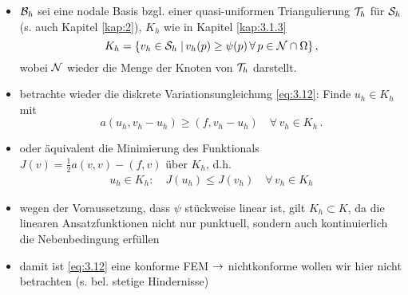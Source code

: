 \begin{itemize}
\item $\mathcal B_h$ sei eine nodale Basis bzgl. einer quasi-uniformen Triangulierung $\mathcal T_h$  für $\mathcal S_h$ (s. auch Kapitel \ref{kap:2}), $K_h$ wie in Kapitel \ref{kap:3.1.3}
\[
	K_h  = \{v_h \in \mathcal S_h \;\vert\, v_h (p) \ge \psi(p) \, \forall \, p \in \mathcal N \cap \Omega\} \, , 
\]
wobei $\mathcal N$ wieder die Menge der Knoten von $\mathcal T_h$ darstellt.

\item betrachte wieder die diskrete Variationsungleichung \eqref{eq:3.12}: Finde $u_h \in K_h$ mit
\[
	a(u_h,v_h-u_h) \ge (f,v_h-u_h) \quad \forall \, v_h \in K_h\, .
\]

\item oder äquivalent die Minimierung des Funktionals $J(v) = \frac 1 2 a(v,v)-(f,v)$ über $K_h$, d.h.
\begin{align}\label{eq:4.1}
	u_h \in K_h :\quad J(u_h)\le J(v_h) \quad \forall \, v_h \in K_h
\end{align}

\item wegen der Voraussetzung, dass $\psi$ stückweise linear ist, gilt $K_h \subset K$, da die linearen Ansatzfunktionen nicht nur punktuell, sondern auch kontinuierlich die Nebenbedingung erfüllen

\item damit ist \eqref{eq:3.12} eine konforme FEM $\rightarrow$ nichtkonforme wollen wir hier nicht betrachten (s. bel. stetige Hindernisse)


\end{itemize}
